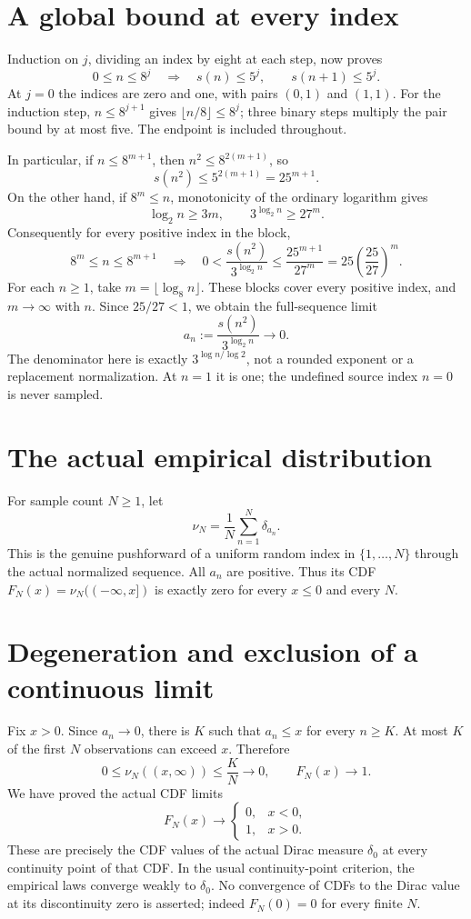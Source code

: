 \documentclass[11pt]{article}
\begin{document}
\newpage
\section*{A global bound at every index}
Induction on $j$, dividing an index by eight at each
step, now proves
\[
        0\leq n\leq8^j\quad\Longrightarrow\quad
                 s(n)\leq5^j,
                 \qquad s(n+1)\leq5^j.
\]
At $j=0$ the indices are zero and one, with pairs
$(0,1)$ and $(1,1)$. For the induction step,
$n\leq8^{j+1}$ gives $\lfloor n/8\rfloor\leq8^j$;
three binary steps multiply the pair bound by at
most five. The endpoint is included throughout.

In particular, if $n\leq8^{m+1}$, then
$n^2\leq8^{2(m+1)}$, so
\[
                       s(n^2)\leq5^{2(m+1)}=25^{m+1}.
\]
On the other hand, if $8^m\leq n$, monotonicity
of the ordinary logarithm gives
\[
       \log_2n\geq3m,\qquad 3^{\log_2 n}\geq27^m.
\]
Consequently for every positive index in the block,
\[
 8^m\leq n\leq8^{m+1}
   \quad\Longrightarrow\quad
 0<\frac{s(n^2)}{3^{\log_2n}}
       \leq\frac{25^{m+1}}{27^m}
       =25\left(\frac{25}{27}\right)^m.
\]
For each $n\geq1$, take $m=\lfloor\log_8n\rfloor$.
These blocks cover every positive index, and
$m\to\infty$ with $n$. Since $25/27<1$, we obtain
the full-sequence limit
\[
             a_n:=\frac{s(n^2)}{3^{\log_2n}}
                         \longrightarrow0.
\]
The denominator here is exactly
$3^{\log n/\log2}$, not a rounded exponent or a
replacement normalization. At $n=1$ it is one;
the undefined source index $n=0$ is never sampled.

\section*{The actual empirical distribution}
For sample count $N\geq1$, let
\[
                  \nu_N=\frac1N\sum_{n=1}^{N}\delta_{a_n}.
\]
This is the genuine pushforward of a uniform random
index in $\{1,\ldots,N\}$ through the actual normalized
sequence. All $a_n$ are positive. Thus its CDF
$F_N(x)=\nu_N(( -\infty,x])$ is exactly zero for
every $x\leq0$ and every $N$.

\newpage
\section*{Degeneration and exclusion of a continuous limit}
Fix $x>0$. Since $a_n\to0$, there is $K$ such that
$a_n\leq x$ for every $n\geq K$. At most $K$ of
the first $N$ observations can exceed $x$. Therefore
\[
       0\leq\nu_N((x,\infty))\leq\frac K N\longrightarrow0,
                    \qquad F_N(x)\longrightarrow1.
\]
We have proved the actual CDF limits
\[
 F_N(x)\longrightarrow
       \begin{cases}0,&x<0,\\1,&x>0.\end{cases}
\]
These are precisely the CDF values of the actual
Dirac measure $\delta_0$ at every continuity point
of that CDF. In the usual continuity-point criterion,
the empirical laws converge weakly to $\delta_0$.
No convergence of CDFs to the Dirac value at its
discontinuity zero is asserted; indeed $F_N(0)=0$
for every finite $N$.
\end{document}
